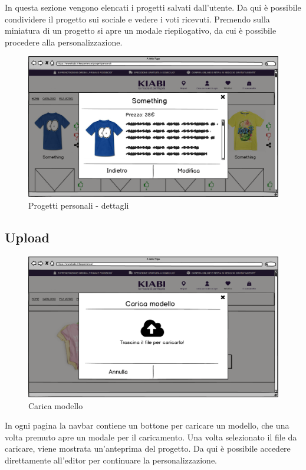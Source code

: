 \documentclass[12pt,italian,]{report}
\begin{document}
In questa sezione vengono elencati i progetti salvati dall'utente. Da
qui è possibile condividere il progetto sui sociale e vedere i voti
ricevuti. Premendo sulla miniatura di un progetto si apre un modale
riepilogativo, da cui è possibile procedere alla personalizzazione.

\begin{figure}[h]
\centering
\includegraphics{img/balsamiq/ProgettiPersonalidetails.png}
\caption{Progetti personali - dettagli}
\end{figure}

\hypertarget{upload}{%
\subsection{Upload}\label{upload}}

\begin{figure}[h]
\centering
\includegraphics{img/balsamiq/UploadModel.png}
\caption{Carica modello}
\end{figure}

In ogni pagina la navbar contiene un bottone per caricare un modello,
che una volta premuto apre un modale per il caricamento. Una volta
selezionato il file da caricare, viene mostrata un'anteprima del
progetto. Da qui è possibile accedere direttamente all'editor per
continuare la personalizzazione.
\end{document}
